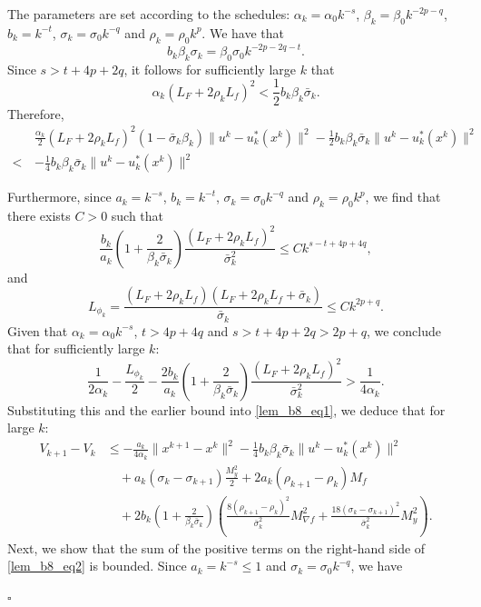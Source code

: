 \documentclass{article}
\newenvironment{proof}[1][Proof]{\par
	\normalfont\topsep6pt\relax
	\trivlist\item[\hskip\labelsep\itshape #1.]\ignorespaces
}{%
	\hfill\ensuremath{\square}\endtrivlist
}
\begin{document}
\begin{proof}[Proof of Proposition \ref{prop4.1}
      ]
The parameters are set according to the schedules: $\alpha_k = \alpha_0 k^{-s}$, $\beta_k = \beta_0 k^{-2p-q}$, $b_k = k^{-t}$, $\sigma_k = \sigma_0 k^{-q}$ and $\rho_k = \rho_0 k^p$. We have that 
\[
b_k \beta_k \sigma_k= \beta_0 \sigma_0 k^{-2p-2q - t}.
\]
Since $s > t + 4p+2q$, it follows for sufficiently large $k$ that 
\[
\alpha_k(L_F + 2\rho_k L_f)^2 < \frac{1}{2}b_k \beta_k\bar{\sigma}_k.
\]
Therefore,
\[
\begin{aligned}
 &\frac{\alpha_k}{2} (L_F + 2\rho_k L_f)^2 (1-\bar{\sigma}_k \beta_k) \| u^{k}- u_{k}^*(x^k)\|^2 -\frac{1}{2}b_k \beta_k\bar{\sigma}_k \|u^{k}-u_{k}^*(x^{k})\|^2\\ <\, &-\frac{1}{4}b_k \beta_k\bar{\sigma}_k \|u^{k}-u_{k}^*(x^{k})\|^2 
\end{aligned}
\]

Furthermore, since $a_k = k^{-s}$, $b_k = k^{-t}$, $\sigma_k = \sigma_0 k^{-q}$ and $\rho_k = \rho_0 k^p$, we find that there exists $C >0$ such that
\[
\frac{b_k}{a_k}(1+\frac{2}{\beta_k\bar{\sigma}_k})\frac{(L_{F}+2\rho_kL_{f})^2}{\bar{\sigma}_k^2} \le C k^{s-t+4p+4q},
\]
and
\[
L_{\phi_k} = \frac{(L_F + 2\rho_kL_f)(L_{F}+2\rho_kL_{f} + \bar{\sigma}_k)}{\bar{\sigma}_k} \le C k^{2p+q}.
\]
Given that  $\alpha_k = \alpha_0 k^{-s}$,  $t > 4p+4q$ and $s > t + 4p + 2q > 2p+q$, we conclude that for sufficiently large $k$:
\[
\frac{1}{2\alpha_k} - \frac{L_{\phi_k}}{2} -\frac{2b_k}{a_k}(1+\frac{2}{\beta_k\bar{\sigma}_k})\frac{(L_{F}+2\rho_kL_{f})^2}{\bar{\sigma}_k^2} > \frac{1}{4\alpha_k} .
\]
Substituting this and the earlier bound into \eqref{lem_b8_eq1}, we deduce that for large $k$:
      \begin{equation}\label{lem_b8_eq2}
      \begin{aligned}
         V_{k+1} - V_k 
         & \le -  \frac{a_k}{4\alpha_k} \|x^{k+1}-x^{k}\|^2 -\frac{1}{4}b_k \beta_k\bar{\sigma}_k \|u^{k}-u_{k}^*(x^{k})\|^2  \\
         & \quad + a_k\left( \sigma_k - \sigma_{k+1} \right)\frac{M_y^2 }{2} + 2a_k\left(\rho_{k+1} - \rho_k\right)M_f \\
         &\quad+ 2b_k(1+\frac{2}{\beta_k\bar{\sigma}_k}) \left( \frac{8(\rho_{k+1} - \rho_k)^2}{\bar{\sigma}_k^2}M_{\nabla f}^2 + \frac{18(\sigma_{k} - \sigma_{k+1})^2}{\bar{\sigma}_k^2}M_y^2 \right).
      \end{aligned}
      \end{equation}
      Next, we show that the sum of the positive terms on the right-hand side of \eqref{lem_b8_eq2} is bounded.
  Since $a_k = k^{-s} \le 1$ and $\sigma_k = \sigma_0 k^{-q}$, we have

\end{proof}
\end{document}
